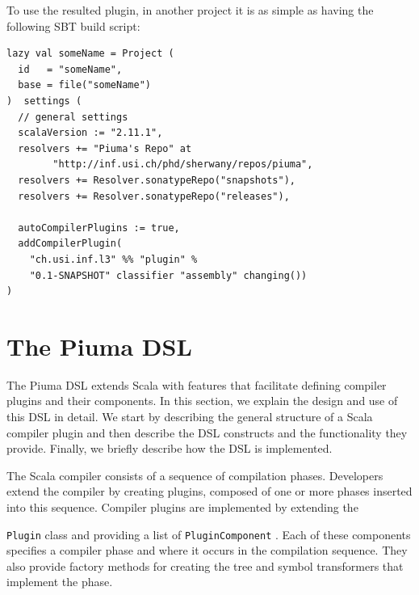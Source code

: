 \documentclass{article}
\renewcommand\c[1]{
  \ifmmode
    \text{#1}
  \else
    \lstinline{#1}
  \fi
}
\begin{document}
\noindent
To use the resulted plugin, in another project it is as simple as having the
following SBT build script:

\begin{verbatim}
lazy val someName = Project (
  id   = "someName",
  base = file("someName")
)  settings (
  // general settings
  scalaVersion := "2.11.1",
  resolvers += "Piuma's Repo" at 
        "http://inf.usi.ch/phd/sherwany/repos/piuma",
  resolvers += Resolver.sonatypeRepo("snapshots"),
  resolvers += Resolver.sonatypeRepo("releases"),

  autoCompilerPlugins := true,
  addCompilerPlugin(
    "ch.usi.inf.l3" %% "plugin" % 
    "0.1-SNAPSHOT" classifier "assembly" changing())
) 
\end{verbatim}

\section{The Piuma DSL}
\label{sec:piumaDSL}


The Piuma DSL extends Scala with features that facilitate defining compiler
plugins and their components. In this section, we explain the design and use of
this DSL in detail. We start by describing the general structure of a Scala
compiler plugin and then describe the DSL constructs and the functionality they
provide. Finally, we briefly describe how the DSL is implemented.

\label{sec:scala_compiler}

The Scala compiler consists of a sequence of compilation phases. Developers
extend the compiler by creating plugins, composed of one or more phases
inserted into this sequence.  Compiler plugins are implemented by extending the
\c{Plugin} class and providing a list of \c{PluginComponent}. Each of these
components specifies a compiler phase and where it occurs in the compilation
sequence. They also provide factory methods for creating the tree and symbol
transformers that implement the phase.
\end{document}
